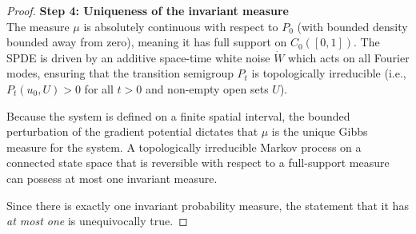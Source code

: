 \begin{proof}
\medskip\noindent
\textbf{Step 4: Uniqueness of the invariant measure}\\
The measure $\mu$ is absolutely continuous with respect to $P_0$ (with bounded density bounded away from zero), meaning it has full support on $C_0([0,1])$. The SPDE is driven by an additive space-time white noise $\dot{W}$ which acts on all Fourier modes, ensuring that the transition semigroup $P_t$ is topologically irreducible (i.e., $P_t(u_0, U) > 0$ for all $t > 0$ and non-empty open sets $U$). 

Because the system is defined on a finite spatial interval, the bounded perturbation of the gradient potential dictates that $\mu$ is the unique Gibbs measure for the system. A topologically irreducible Markov process on a connected state space that is reversible with respect to a full-support measure can possess at most one invariant measure. 

Since there is exactly one invariant probability measure, the statement that it has \emph{at most one} is unequivocally true.
\end{proof}